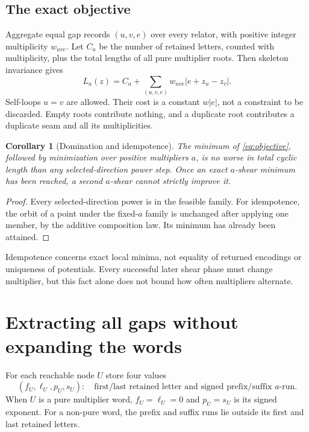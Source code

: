 \documentclass[11pt,letterpaper]{article}
\newtheorem{corollary}[theorem]{Corollary}
\theoremstyle{definition}
\theoremstyle{remark}\newtheorem{remark}[theorem]{Remark}
\begin{document}
\subsection{The exact objective}

Aggregate equal gap records $(u,v,e)$ over every relator, with positive integer
multiplicity $w_{uve}$. Let $C_a$ be the number of retained letters, counted
with multiplicity, plus the total lengths of all pure multiplier roots.
Then skeleton invariance gives
\begin{equation}
 L_a(z)=C_a+\sum_{(u,v,e)}w_{uve}|e+z_u-z_v|.
 \label{eq:objective}
\end{equation}
Self-loops $u=v$ are allowed. Their cost is a constant $w|e|$, not a constraint
to be discarded. Empty roots contribute nothing, and a duplicate root
contributes a duplicate seam and all its multiplicities.

\begin{corollary}[Domination and idempotence]
The minimum of \eqref{eq:objective}, followed by minimization over positive
multipliers $a$, is no worse in total cyclic length than any selected-direction
power step. Once an exact $a$-shear minimum has been reached, a second
$a$-shear cannot strictly improve it.
\end{corollary}
\begin{proof}
Every selected-direction power is in the feasible family. For idempotence,
the orbit of a point under the fixed-$a$ family is unchanged after applying
one member, by the additive composition law. Its minimum has already been
attained.
\end{proof}

Idempotence concerns exact local minima, not equality of returned encodings
or uniqueness of potentials. Every successful later shear phase must change
multiplier, but this fact alone does not bound how often multipliers alternate.

\section{Extracting all gaps without expanding the words}
\label{sec:histogram}

For each reachable node $U$ store four values
\[
 (f_U,\ell_U,p_U,s_U):
 \quad\text{first/last retained letter and signed prefix/suffix $a$-run.}
\]
When $U$ is a pure multiplier word, $f_U=\ell_U=0$ and
$p_U=s_U$ is its signed exponent. For a non-pure word, the prefix and suffix
runs lie outside its first and last retained letters.
\end{document}
